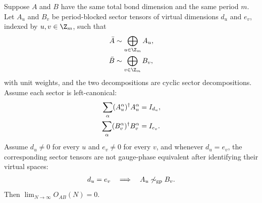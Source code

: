 \begin{lemma}%
    \label{thm:periodic_overlap_zero_no_sector_match}
    \leanok
    Suppose $A$ and $B$ have the same total bond dimension and the same
    period $m$. Let $A_u$ and $B_v$ be period-blocked sector tensors of virtual
    dimensions $d_u$ and $e_v$, indexed by $u,v\in\Z_m$, such that
    \begin{align}
        \bar A & \sim\bigoplus_{u\in\Z_m}A_u, \notag \\
        \bar B & \sim\bigoplus_{v\in\Z_m}B_v, \notag
    \end{align}
    with unit weights, and the two decompositions are cyclic sector
    decompositions. Assume each sector is left-canonical:
    \begin{align}
        \sum_{\alpha}(A_u^\alpha)^\dagger A_u^\alpha & =I_{d_u}, \notag \\
        \sum_{\alpha}(B_v^\alpha)^\dagger B_v^\alpha & =I_{e_v}. \notag
    \end{align}
    Assume $d_u\ne0$ for every $u$ and $e_v\ne0$ for every $v$, and
    whenever $d_u=e_v$, the corresponding sector tensors are not gauge-phase
    equivalent after identifying their virtual spaces:
    \begin{align}
        d_u=e_v\quad\Longrightarrow\quad
        A_u\not\sim_{\mathrm{gp}}B_v. \notag
    \end{align}
    Then $\lim_{N\to\infty}O_{AB}(N)=0$.
\end{lemma}

